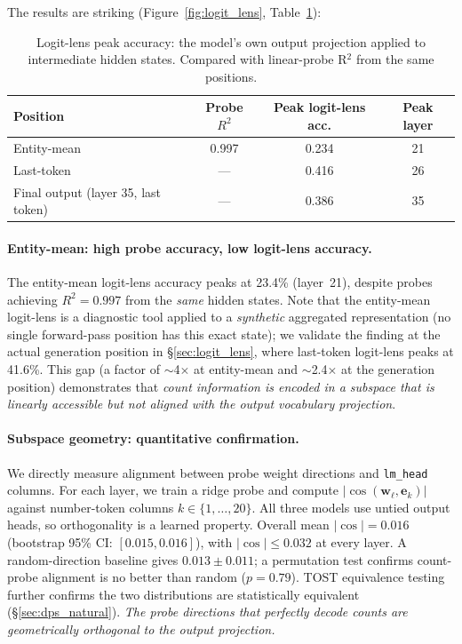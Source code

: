 \documentclass{article}
\begin{document}
The results are striking (Figure~\ref{fig:logit_lens}, Table~\ref{tab:logit_lens}):

\begin{table}[h]
\centering
\caption{Logit-lens peak accuracy: the model's own output projection applied to
intermediate hidden states. Compared with linear-probe R$^2$ from the same positions.}
\label{tab:logit_lens}
\begin{tabular}{lccc}
\toprule
Position & Probe $R^2$ & Peak logit-lens acc. & Peak layer \\
\midrule
Entity-mean & 0.997 & 0.234 & 21 \\
Last-token & --- & 0.416 & 26 \\
Final output (layer 35, last token) & --- & 0.386 & 35 \\
\bottomrule
\end{tabular}
\end{table}

\paragraph{Entity-mean: high probe accuracy, low logit-lens accuracy.}

The entity-mean logit-lens accuracy peaks at 23.4\% (layer~21), despite probes achieving
$R^2 = 0.997$ from the \emph{same} hidden states.
Note that the entity-mean logit-lens is a diagnostic tool applied to a
\emph{synthetic} aggregated representation (no single forward-pass position
has this exact state); we validate the finding at the actual generation position
in \S\ref{sec:logit_lens}, where last-token logit-lens peaks at 41.6\%.
This gap (a factor of $\sim$4$\times$ at entity-mean and $\sim$2.4$\times$
at the generation position) demonstrates that
\emph{count information is encoded in a subspace that is linearly accessible but not aligned with
the output vocabulary projection}.

\paragraph{Subspace geometry: quantitative confirmation.}

We directly measure alignment between probe weight directions and \texttt{lm\_head} columns.
For each layer, we train a ridge probe and compute
$|\cos(\mathbf{w}_\ell, \mathbf{e}_k)|$ against number-token columns $k \in \{1, \ldots, 20\}$.
All three models use untied output heads, so orthogonality is a learned property.
Overall mean $|\cos| = 0.016$ (bootstrap 95\% CI: $[0.015, 0.016]$), with
$|\cos| \leq 0.032$ at every layer.
A random-direction baseline gives $0.013 \pm 0.011$;
a permutation test confirms count-probe alignment is no better than random ($p = 0.79$).
TOST equivalence testing further confirms the two distributions are
statistically equivalent (\S\ref{sec:dps_natural}).
\emph{The probe directions that perfectly decode counts are geometrically orthogonal to the
output projection.}
\end{document}
